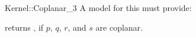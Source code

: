 \begin{ccRefFunctionObjectConcept}{Kernel::Coplanar_3}
A model for this must provide:


{returns , if $p$, $q$, $r$, and $s$ are coplanar.}

\ccIsModel{}

\end{ccRefFunctionObjectConcept}
